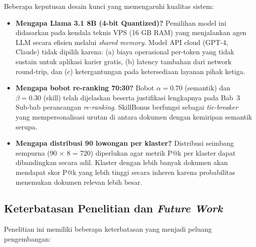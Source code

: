 Beberapa keputusan desain kunci yang memengaruhi kualitas sistem:
\begin{itemize}
  \item \textbf{Mengapa Llama 3.1 8B (4-bit Quantized)?}
    Pemilihan model ini didasarkan pada kendala teknis VPS (16 GB RAM) yang menjalankan
    agen LLM secara efisien melalui \textit{shared memory}. Model API cloud (GPT-4, Claude) tidak dipilih karena:
    (a) biaya operasional per-token yang tidak sustain untuk aplikasi karier gratis,
    (b) latency tambahan dari network round-trip, dan (c) ketergantungan pada
    ketersediaan layanan pihak ketiga.
  \item \textbf{Mengapa bobot re-ranking 70:30?}
    Bobot $\alpha = 0.70$ (semantik) dan $\beta = 0.30$ (skill) telah dijelaskan
    beserta justifikasi lengkapnya pada Bab~3 Sub-bab perancangan \textit{re-ranking}.
    SkillBonus berfungsi sebagai \textit{tie-breaker} yang mempersonalisasi urutan
    di antara dokumen dengan kemiripan semantik serupa.
  \item \textbf{Mengapa distribusi 90 lowongan per klaster?}
    Distribusi seimbang sempurna (90 $\times$ 8 = 720) diperlukan agar metrik P@k
    per klaster dapat dibandingkan secara adil. Klaster dengan lebih banyak dokumen
    akan mendapat skor P@k yang lebih tinggi secara inheren karena probabilitas
    menemukan dokumen relevan lebih besar.
\end{itemize}

\subsection{Keterbatasan Penelitian dan \textit{Future Work}}
Penelitian ini memiliki beberapa keterbatasan yang menjadi peluang pengembangan:

